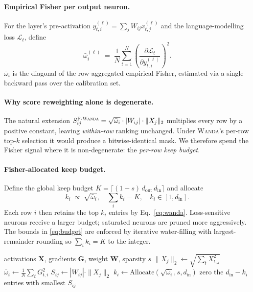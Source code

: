 \documentclass[11pt]{article}
\newcommand{\fwanda}{\textsc{F-Wanda}}
\newcommand{\wanda}{\textsc{Wanda}}
\begin{document}
\paragraph{Empirical Fisher per output neuron.}
For the layer's pre-activation $y_{t,i}^{(\ell)}=\sum_j W_{ij} x_{t,j}^{(\ell)}$
and the language-modelling loss $\mathcal{L}_t$, define
\begin{equation}
\bar\omega_i^{(\ell)} \;=\; \frac{1}{N}\sum_{t=1}^N \left(\frac{\partial \mathcal{L}_t}{\partial y_{t,i}^{(\ell)}}\right)^{\!2}\!.
\label{eq:fisher}
\end{equation}
\(\bar\omega_i\) is the diagonal of the row-aggregated empirical Fisher,
estimated via a single backward pass over the calibration set.

\paragraph{Why score reweighting alone is degenerate.}
The natural extension $S_{ij}^{\fwanda} = \sqrt{\bar\omega_i}\cdot|W_{ij}|\cdot\|X_j\|_2$
multiplies every row by a positive constant, leaving \emph{within-row}
ranking unchanged. Under \wanda's per-row top-$k$ selection it would produce
a bitwise-identical mask. We therefore spend the Fisher signal where it is
non-degenerate: the \emph{per-row keep budget}.

\paragraph{Fisher-allocated keep budget.}
Define the global keep budget $K = \lceil (1-s)\,d_\text{out}\,d_\text{in} \rceil$
and allocate
\begin{equation}
k_i \;\propto\; \sqrt{\bar\omega_i},\quad \sum_i k_i = K,\quad k_i \in [1, d_\text{in}].
\label{eq:budget}
\end{equation}
Each row $i$ then retains the top $k_i$ entries by Eq.~\eqref{eq:wanda}.
Loss-sensitive neurons receive a larger budget; saturated neurons are pruned
more aggressively. The bounds in \eqref{eq:budget} are enforced by
iterative water-filling with largest-remainder rounding so $\sum_i k_i = K$
to the integer.

\begin{algorithm}[t]
\caption{\fwanda{} pruning (per linear layer)}
\label{alg:fwanda}
\begin{algorithmic}[1]
\Require activations $\mathbf{X}$, gradients $\mathbf{G}$, weight $\mathbf{W}$, sparsity $s$
\State $\|X_j\|_2 \gets \sqrt{\sum_t X_{t,j}^2}$ 
\State $\bar\omega_i \gets \tfrac{1}{N}\sum_t G_{t,i}^2$ 
\State $S_{ij} \gets |W_{ij}|\cdot \|X_j\|_2$
\State $k_i \gets \mathrm{Allocate}(\sqrt{\bar\omega_i}, s, d_\text{in})$ 
 \State zero the $d_\text{in}-k_i$ entries with smallest $S_{ij}$ \EndFor
\end{algorithmic}
\end{algorithm}
\end{document}
